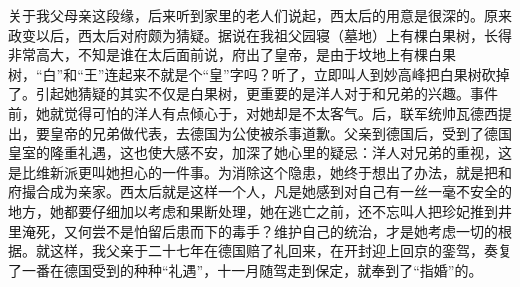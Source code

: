   关于我父母亲这段缘，后来听到家里的老人们说起，西太后的用意是很深的。原来政变以后，西太后对府颇为猜疑。据说在我祖父园寝（墓地）上有棵白果树，长得非常高大，不知是谁在太后面前说，府出了皇帝，是由于坟地上有棵白果树，“白”和“王”连起来不就是个“皇”字吗？听了，立即叫人到妙高峰把白果树砍掉了。引起她猜疑的其实不仅是白果树，更重要的是洋人对于和兄弟的兴趣。事件前，她就觉得可怕的洋人有点倾心于，对她却是不太客气。后，联军统帅瓦德西提出，要皇帝的兄弟做代表，去德国为公使被杀事道歉。父亲到德国后，受到了德国皇室的隆重礼遇，这也使大感不安，加深了她心里的疑忌：洋人对兄弟的重视，这是比维新派更叫她担心的一件事。为消除这个隐患，她终于想出了办法，就是把和府撮合成为亲家。西太后就是这样一个人，凡是她感到对自己有一丝一毫不安全的地方，她都要仔细加以考虑和果断处理，她在逃亡之前，还不忘叫人把珍妃推到井里淹死，又何尝不是怕留后患而下的毒手？维护自己的统治，才是她考虑一切的根据。就这样，我父亲于二十七年在德国赔了礼回来，在开封迎上回京的銮驾，奏复了一番在德国受到的种种“礼遇”，十一月随驾走到保定，就奉到了“指婚”的。
